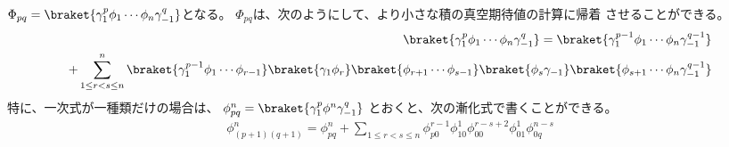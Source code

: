{\begin{todo}[正規積順序の計算]
		$\Phi_{pq}=\braket{\gamma_1^p\phi_1\cdots\phi_n\gamma_{-1}^q}$となる。
		$\Phi_{pq}$は、次のようにして、より小さな積の真空期待値の計算に帰着
		させることができる。
		\begin{equation*}\begin{split}
			\braket{\gamma_1^p\phi_1\cdots\phi_n\gamma_{-1}^q}
			= \braket{\gamma_1^{p-1}\phi_1\cdots\phi_n\gamma_{-1}^{q-1}} \\
			+ \sum_{1\le r< s\le n}^n
				\braket{\gamma_1^{p-1}\phi_1\cdots\phi_{r-1}}
				\braket{\gamma_1\phi_r}
				\braket{\phi_{r+1}\cdots\phi_{s-1}}
				\braket{\phi_s\gamma_{-1}}
				\braket{\phi_{s+1}\cdots\phi_n\gamma_{-1}^{q-1}} \\
		\end{split}\end{equation*}
		特に、一次式が一種類だけの場合は、
		$\phi^n_{pq}=\braket{\gamma_1^p\phi^n\gamma_{-1}^q}$
		とおくと、次の漸化式で書くことができる。
		\begin{equation*}\begin{split}
			\phi^n_{(p+1)(q+1)} = \phi^n_{pq} + \sum_{1\le r< s\le n} 
				\phi^{r-1}_{p0}\phi^{1}_{10}\phi^{r-s+2}_{00}\phi^{1}_{01}
				\phi^{n-s}_{0q}
		\end{split}\end{equation*}
	\end{todo} %

}
